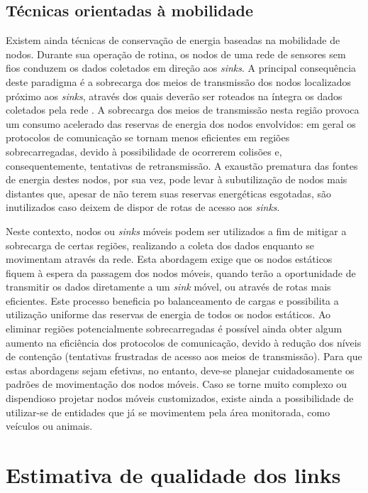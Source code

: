 \documentclass[
	12pt,				%
	openright,			%
	oneside,
	a4paper,			%
	english,			%
	french,				%
	spanish,			%
	brazil				%
	]{abntex2}
\begin{document}
\subsection{Técnicas orientadas à mobilidade}

Existem ainda técnicas de conservação de energia baseadas na mobilidade de nodos. Durante sua operação de rotina, os nodos de uma rede de sensores sem fios conduzem os dados coletados em direção aos \textit{sinks}. A principal consequência deste paradigma é a sobrecarga dos meios de transmissão dos nodos localizados próximo aos \textit{sinks}, através dos quais deverão ser roteados na íntegra os dados coletados pela rede \cite{Li2007}. A sobrecarga dos meios de transmissão nesta região provoca um consumo acelerado das reservas de energia dos nodos envolvidos: em geral os protocolos de comunicação se tornam menos eficientes em regiões sobrecarregadas, devido à possibilidade de ocorrerem colisões e, consequentemente, tentativas de retransmissão. A exaustão prematura das fontes de energia destes nodos, por sua vez, pode levar à subutilização de nodos mais distantes que, apesar de não terem suas reservas energéticas esgotadas, são inutilizados caso deixem de dispor de rotas de acesso aos \textit{sinks}.

Neste contexto, nodos ou \textit{sinks} móveis podem ser utilizados a fim de mitigar a sobrecarga de certas regiões, realizando a coleta dos dados enquanto se movimentam através da rede. Esta abordagem exige que os nodos estáticos fiquem à espera da passagem dos nodos móveis, quando terão a oportunidade de transmitir os dados diretamente a um \textit{sink} móvel, ou através de rotas mais eficientes. Este processo beneficia po balanceamento de cargas e possibilita a utilização uniforme das reservas de energia de todos os nodos estáticos. Ao eliminar regiões potencialmente sobrecarregadas é possível ainda obter algum aumento na eficiência dos protocolos de comunicação, devido à redução dos níveis de contenção (tentativas frustradas de acesso aos meios de transmissão). Para que estas abordagens sejam efetivas, no entanto, deve-se planejar cuidadosamente os padrões de movimentação dos nodos móveis. Caso se torne muito complexo ou dispendioso projetar nodos móveis customizados, existe ainda a possibilidade de utilizar-se de entidades que já se movimentem pela área monitorada, como veículos ou animais.

\section{Estimativa de qualidade  dos links}
\end{document}
